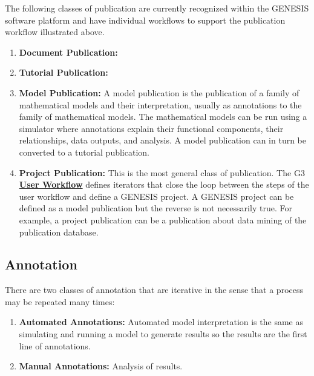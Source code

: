 \documentclass[12pt]{article}
\begin{document}
The following classes of publication are currently recognized within the GENESIS software platform and have individual workflows to support the publication workflow illustrated above.

\begin{enumerate}
   \item {\bf Document Publication:}
   \item {\bf Tutorial Publication:}
   \item {\bf Model Publication:} A model publication is the publication of a family of mathematical models and their interpretation, usually as annotations to the family of mathematical models. The mathematical models can be run using a simulator where annotations explain their functional components, their relationships, data outputs, and analysis. A model publication can in turn be converted to a tutorial publication.
   \item{\bf Project Publication:} This is the most general class of publication. The G3 \href{../workflow-user/eotkflow-user.tex}{\bf User Workflow} defines iterators that close the loop between the steps of the user workflow and define a GENESIS project. A GENESIS project can be defined as  a model publication but the reverse is not necessarily true. For example, a project publication can be a publication about data mining of the publication database.
\end{enumerate}

\subsection*{Annotation}

There are two classes of annotation that are iterative in the sense that a process may be repeated many times:

\begin{enumerate}
   \item {\bf Automated Annotations:} Automated model interpretation is the same as simulating and running a model to generate results so the results are the first line of annotations.
   \item {\bf Manual Annotations:} Analysis of results.
\end{enumerate}
\end{document}
